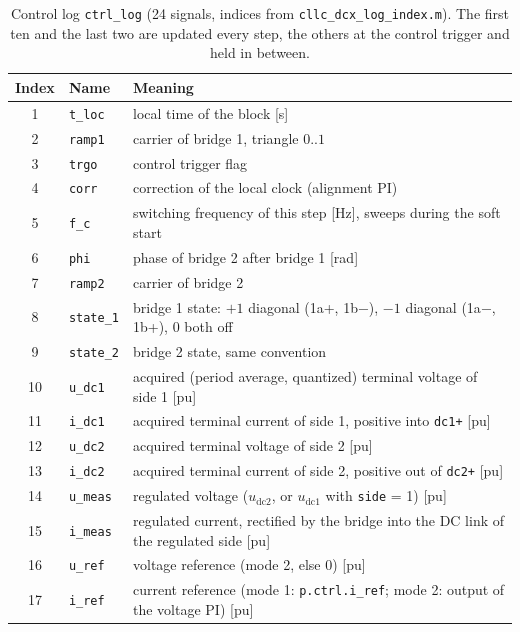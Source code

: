 \documentclass[12pt,a4paper]{scrartcl}
\newcommand{\ped}[1]{_{\mathrm{#1}}}
\newcommand{\code}[1]{\texttt{#1}}
\begin{document}
\begin{onehalfspace}
\begin{table}[H]
	\centering
	\captionsetup{width=0.9\textwidth, font=small}
	\caption[Control log of the block.]{Control log \code{ctrl\_log} (24 signals, indices from \code{cllc\_dcx\_log\_index.m}). The first ten and the last two are updated every step, the others at the control trigger and held in between.}
	\label{tab:log}
	\small
	\begin{tabularx}{0.95\textwidth}{@{} c l X @{}}
		\toprule
		\textbf{Index} & \textbf{Name} & \textbf{Meaning} \\
		\midrule
		1 & \code{t\_loc} & local time of the block [\si{\second}] \\
		2 & \code{ramp1} & carrier of bridge 1, triangle $0..1$ \\
		3 & \code{trgo} & control trigger flag \\
		4 & \code{corr} & correction of the local clock (alignment PI) \\
		5 & \code{f\_c} & switching frequency of this step [\si{\hertz}], sweeps during the soft start \\
		6 & \code{phi} & phase of bridge 2 after bridge 1 [\si{\radian}] \\
		7 & \code{ramp2} & carrier of bridge 2 \\
		8 & \code{state\_1} & bridge 1 state: $+1$ diagonal (1a+, 1b$-$), $-1$ diagonal (1a$-$, 1b+), $0$ both off \\
		9 & \code{state\_2} & bridge 2 state, same convention \\
		10 & \code{u\_dc1} & acquired (period average, quantized) terminal voltage of side 1 [pu] \\
		11 & \code{i\_dc1} & acquired terminal current of side 1, positive into \code{dc1+} [pu] \\
		12 & \code{u\_dc2} & acquired terminal voltage of side 2 [pu] \\
		13 & \code{i\_dc2} & acquired terminal current of side 2, positive out of \code{dc2+} [pu] \\
		14 & \code{u\_meas} & regulated voltage ($u\ped{dc2}$, or $u\ped{dc1}$ with \code{side} = 1) [pu] \\
		15 & \code{i\_meas} & regulated current, rectified by the bridge into the DC link of the regulated side [pu] \\
		16 & \code{u\_ref} & voltage reference (mode 2, else 0) [pu] \\
		17 & \code{i\_ref} & current reference (mode 1: \code{p.ctrl.i\_ref}; mode 2: output of the voltage PI) [pu] \\

\end{tabularx}
\end{table}
\end{onehalfspace}
\end{document}
